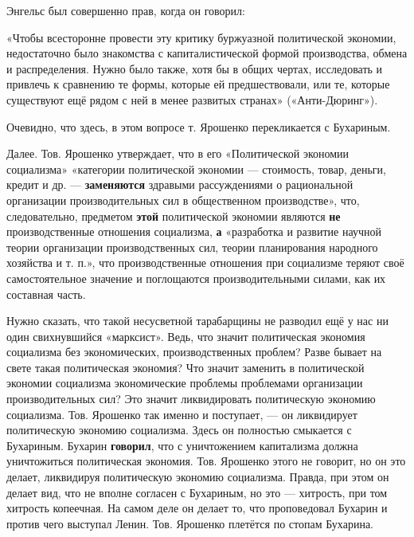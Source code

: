 \documentclass[12pt, a4paper, openany]{book}
\begin{document}
Энгельс был совершенно прав, когда он говорил:



«Чтобы всесторонне провести эту критику буржуазной политической экономии, недостаточно было знакомства с капиталистической формой производства, обмена и распределения. Нужно было также, хотя бы в общих чертах, исследовать и привлечь к сравнению те формы, которые ей предшествовали, или те, которые существуют ещё рядом с ней в менее развитых странах» («Анти-Дюринг»).



Очевидно, что здесь, в этом вопросе т. Ярошенко перекликается с Бухариным.



Далее. Тов. Ярошенко утверждает, что в его «Политической экономии социализма» «категории политической экономии — стоимость, товар, деньги, кредит и др. — \textbf{заменяются} здравыми рассуждениями о рациональной организации производительных сил в общественном производстве», что, следовательно, предметом \textbf{этой} политической экономии являются \textbf{не} производственные отношения социализма, \textbf{а} «разработка и развитие научной теории организации производственных сил, теории планирования народного хозяйства и т. п.», что производственные отношения при социализме теряют своё самостоятельное значение и поглощаются производительными силами, как их составная часть.



Нужно сказать, что такой несусветной тарабарщины не разводил ещё у нас ни один свихнувшийся «марксист». Ведь, что значит политическая экономия социализма без экономических, производственных проблем? Разве бывает на свете такая политическая экономия? Что значит заменить в политической экономии социализма экономические проблемы проблемами организации производительных сил? Это значит ликвидировать политическую экономию социализма. Тов. Ярошенко так именно и поступает, — он ликвидирует политическую экономию социализма. Здесь он полностью смыкается с Бухариным. Бухарин \textbf{говорил}, что с уничтожением капитализма должна уничтожиться политическая экономия. Тов. Ярошенко этого не говорит, но он это делает, ликвидируя политическую экономию социализма. Правда, при этом он делает вид, что не вполне согласен с Бухариным, но это — хитрость, при том хитрость копеечная. На самом деле он делает то, что проповедовал Бухарин и против чего выступал Ленин. Тов. Ярошенко плетётся по стопам Бухарина.
\end{document}
